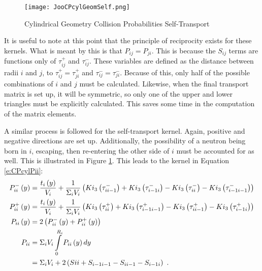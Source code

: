 \begin{figure}[h]
  \centering
  \texttt{[image: JooCPcylGeomSelf.png]}
  \caption[Cylindrical Geometry Collision Probabilities Self-Transport]{Cylindrical Geometry Collision Probabilities Self-Transport}\label{f:CPcylGeomSelf}
\end{figure}

It is useful to note at this point that the principle of reciprocity exists for these kernels.  What is meant by this is that $P_{ij} = P_{ji}$.  This is because the $S_{ij}$ terms are functions only of $\tau_{ij}^+$ and $\tau_{ij}^-$.  These variables are defined as the distance between radii $i$ and $j$, to $\tau_{ij}^+ = \tau_{ji}^+$ and $\tau_{ij}^- = \tau_{ji}^-$.  Because of this, only half of the possible combinations of $i$ and $j$ must be calculated.  Likewise, when the final transport matrix is set up, it will be symmetric, so only one of the upper and lower triangles must be explicitly calculated.  This saves some time in the computation of the matrix elements.

A similar process is followed for the self-transport kernel.  Again, positive and negative directions are set up.  Additionally, the possibility of a neutron being born in $i$, escaping, then re-entering the other side of $i$ must be accounted for as well.  This is illustrated in Figure \ref{f:CPcylGeomSelf}.  This leads to the kernel in Equation \ref{e:CPcylPii}:
\begin{subequations}\label{e:CPcylPii}
  \begin{align}
  P_{ii}^-\left(y\right) &= \frac{t_i\left(y\right)}{V_i} + \frac{1}{\Sigma_i V_i}\left(Ki_3\left(\tau_{ii-1}^-\right) + Ki_3\left(\tau_{i-1i}^-\right) - Ki_3\left(\tau_{ii}^-\right) - Ki_3\left(\tau_{i-1i-1}^-\right)\right) \\
  P_{ii}^+\left(y\right) &= \frac{t_i\left(y\right)}{V_i} + \frac{1}{\Sigma_i V_i}\left(Ki_3\left(\tau_{ii}^+\right) + Ki_3\left(\tau_{i-1i-1}^+\right) - Ki_3\left(\tau_{ii-1}^+\right) - Ki_3\left(\tau_{i-1i}^+\right)\right) \\
  P_{ii}\left(y\right) &= 2 \left(P_{ii}^-\left(y\right) + P_{ii}^+\left(y\right)\right) \\
  P_{ii} &= \Sigma_i V_i \intop_0^{R_i} P_{ii}\left(y\right) dy \nonumber \\
  &= \Sigma_i V_i  + 2\left(S{ii} + S_{i-1i-1} - S_{ii-1} - S_{i-1i}\right)\ .
  \end{align}
\end{subequations}

